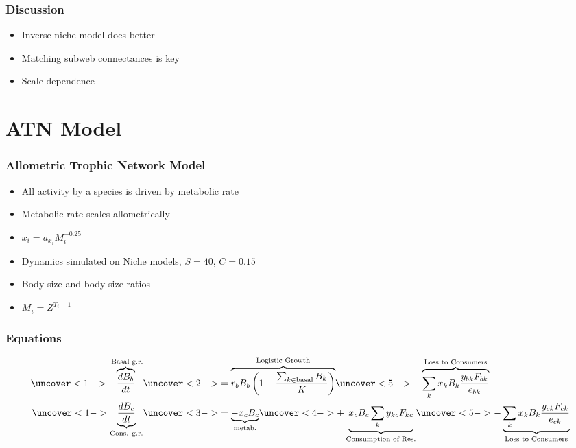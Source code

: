 \documentclass[table]{beamer}
\begin{document}
\begin{frame}
    \frametitle{Discussion}
    \begin{itemize}[<+->]
        \item Inverse niche model does better
        \item Matching subweb connectances is key
        \item Scale dependence
    \end{itemize}
\end{frame}

\section{ATN Model}

\begin{frame}
    \frametitle{Allometric Trophic Network Model} 
    \begin{itemize}[<+->]
        \item All activity by a species is driven by metabolic rate
        \item Metabolic rate scales allometrically
        \item $x_i = a_{x_i}M_i^{-0.25}$
        \item Dynamics simulated on Niche models, $S=40$, $C=0.15$
        \item Body size and body size ratios
        \item $M_i = Z^{T_i-1}$
    \end{itemize}
\end{frame}


\begin{frame}
    \frametitle{Equations} 
    \begin{align*}
        \uncover<1->{\overbrace{\frac{dB_{b}}{dt}}^\text{
            Basal g.r.}} &
            \uncover<2->{=\overbrace{r_bB_b\left(1-\frac{\sum_{k\in\text{basal}}B_k}{K}\right)}^\text{Logistic
                Growth}}\uncover<5->{-\overbrace{\sum_kx_kB_k\frac{y_{bk}F_{bk}}{e_{bk}}}^\text{Loss
            to Consumers}}\\ 
            \uncover<1->{\underbrace{\frac{dB_{c}}{dt}}_\text{Cons. g.r.}} &
            \uncover<3->{= \underbrace{-x_cB_c}_\text{metab.}} \uncover<4->{+
                \underbrace{x_cB_c\sum_ky_{kc}F_{kc}}_\text{Consumption of
                Res.}} \uncover<5->{- \underbrace{\sum_k
        x_kB_k\frac{y_{ck}F_{ck}}{e_{ck}}}_\text{Loss to Consumers}}
    \end{align*}
\end{frame}
\end{document}
